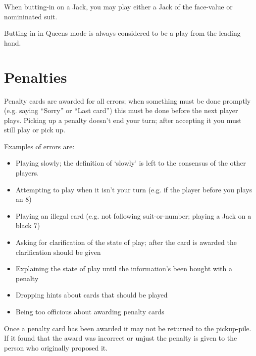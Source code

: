 \documentclass[12pt]{article}
\begin{document}
When butting-in on a Jack, you may play either a Jack of the face-value or nomininated suit.

Butting in in Queens mode is always considered to be a play from the leading hand.

\section{Penalties}
\label{penalties}

Penalty cards are awarded for all errors;  when something must be done promptly (e.g. saying ``Sorry'' or
``Last card'') this must be done before the next player plays.  Picking up a penalty doesn't
end your turn;  after accepting it you must still play or pick up.

Examples of errors are:

\begin{itemize}
  \item Playing slowly;  the definition of `slowly' is left to the consensus of the other players.

  \item Attempting to play when it isn't your turn (e.g. if the player before you plays an 8)

  \item Playing an illegal card (e.g. not following suit-or-number;  playing a Jack on a black 7)

  \item Asking for clarification of the state of play;  after the card is awarded the
    clarification should be given

  \item Explaining the state of play until the information's been bought with a penalty

  \item Dropping hints about cards that should be played

  \item Being too officious about awarding penalty cards
\end{itemize}

Once a penalty card has been awarded it may not be returned to the pickup-pile.  If it found that the award was
incorrect or unjust the penalty is given to the person who originally proposed it.
\end{document}
